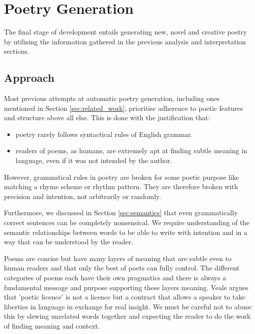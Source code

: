 \chapter{Poetry Generation}
\ifpdf
    \graphicspath{{Management/ManagementFigs/PNG/}{Management/ManagementFigs/PDF/}{Management/ManagementFigs/}}
\else
    \graphicspath{{Management/ManagementFigs/EPS/}{Management/ManagementFigs/}}
\fi

The final stage of development entails generating new, novel and creative poetry by utilising the information gathered in the previous analysis and interpretation sections.

\section{Approach}
Most previous attempts at automatic poetry generation, including ones mentioned in Section \ref{sec:related_work}, prioritise adherence to poetic features and structure above all else. This is done with the justification that:
\begin{itemize}
\item{poetry rarely follows syntactical rules of English grammar.}
\item{readers of poems, as humans, are extremely apt at finding subtle meaning in language, even if it was not intended by the author.}
\end{itemize}

However, grammatical rules in poetry are broken for some poetic purpose like matching a rhyme scheme or rhythm pattern. They are therefore broken with precision and intention, not arbitrarily or randomly.

Furthermore, we discussed in Section \ref{sec:semantics} that even grammatically correct sentences can be completely nonsensical. We require understanding of the semantic relationships between words to be able to write with intention and in a way that can be understood by the reader.

Poems are concise but have many layers of meaning that are subtle even to human readers and that only the best of poets can fully control. The different categories of poems each have their own pragmatics and there is always a fundamental message and purpose supporting these layers meaning. Veale argues that 'poetic licence' is not a licence but a contract that allows a speaker to take liberties in language in exchange for real insight\cite{veale2013less}. We must be careful not to abuse this by slewing unrelated words together and expecting the reader to do the work of finding meaning and context.


